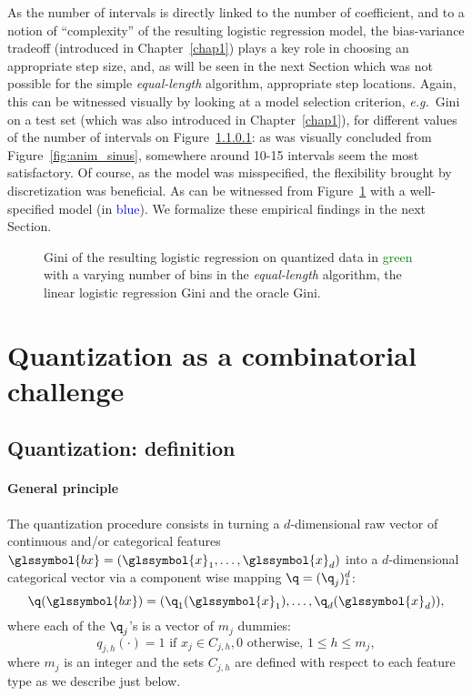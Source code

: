 As the number of intervals is directly linked to the number of coefficient, and to a notion of ``complexity'' of the resulting logistic regression model, the bias-variance tradeoff (introduced in Chapter~\ref{chap1}) plays a key role in choosing an appropriate step size, and, as will be seen in the next Section which was not possible for the simple \textit{equal-length} algorithm, appropriate step locations. Again, this can be witnessed visually by looking at a model selection criterion, \textit{e.g.}\ Gini on a test set (which was also introduced in Chapter~\ref{chap1}), for different values of the number of intervals on Figure~\ref{}: as was visually concluded from Figure~\ref{fig:anim_sinus}, somewhere around 10-15 intervals seem the most satisfactory. Of course, as the model was misspecified, the flexibility brought by discretization was beneficial. As can be witnessed from Figure~\ref{fig:bic_sin} with a well-specified model (in \textcolor{blue}{blue}). We formalize these empirical findings in the next Section.



\begin{figure}
\resizebox{\textwidth}{7cm}{}
\caption{\label{fig:bic_sin} Gini of the resulting logistic regression on quantized data in \textcolor{green}{green} with a varying number of bins in the \textit{equal-length} algorithm, the linear logistic regression Gini and the oracle Gini.}
\end{figure}


 
\section{Quantization as a combinatorial challenge} \label{sec:model_selection}

\subsection{Quantization: definition}

\paragraph{General principle}

The quantization procedure consists in turning a $d$-dimensional raw vector of continuous and/or categorical features $\glssymbol{bx} = (\glssymbol{x}_1, \ldots, \glssymbol{x}_d)$ into a $d$-dimensional categorical vector via a component wise mapping $\q=(\q_j)_1^d$:
\[\q(\glssymbol{bx})=(\q_1(\glssymbol{x}_1),\ldots,\q_d(\glssymbol{x}_d)),\]
where each of the $\q_j$'s is a vector of $m_j$ dummies: 
\begin{equation}\label{eq:qj}
q_{j,h}(\cdot) =  1 \text{ if } x_j \in C_{j,h}, 0 \text{ otherwise, } 1 \leq h \leq m_j,
\end{equation}
where $m_j$ is an integer and the sets $C_{j,h}$ are defined with respect to each feature type as we describe just below.
